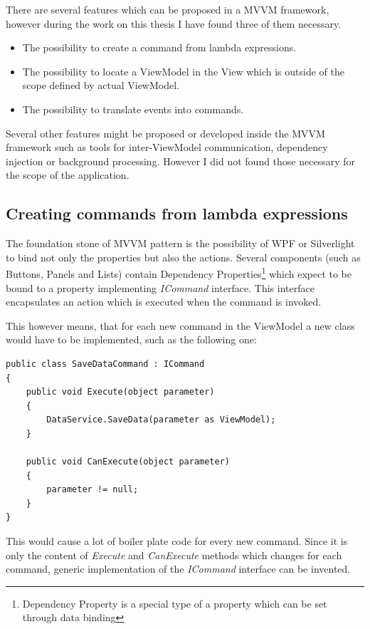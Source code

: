 There are several features which can be proposed in a MVVM framework, however during the work on this thesis I have found three of them necessary.

\begin{itemize}
	\item  The possibility to create a command from lambda expressions.
	\item  The possibility to locate a ViewModel in the View which is outside of the scope defined by actual ViewModel.
	\item  The possibility to translate events into commands.
\end{itemize}

Several other features might be proposed or developed inside the MVVM framework such as tools for inter-ViewModel communication, dependency injection or background processing. However I did not found those necessary for the scope of the application.

\subsection{Creating commands from lambda expressions}
The foundation stone of MVVM pattern is the possibility of WPF or Silverlight to bind not only the properties but also the actions. Several components (such as Buttons, Panels and Lists) contain Dependency Properties\footnote{Dependency Property is a special type of a property which can be set through data binding} which expect to be bound to a property implementing \textit{ICommand} interface. This interface encapsulates an action which is executed when the command is invoked. 

This however means, that for each new command in the ViewModel a new class would have to be implemented, such as the following one:
\begin{verbatim}
public class SaveDataCommand : ICommand
{	
    public void Execute(object parameter)
    {
        DataService.SaveData(parameter as ViewModel);
    }
    
    public void CanExecute(object parameter)
    {
        parameter != null;
    }
}
\end{verbatim}

This would cause a lot of boiler plate code for every new command. Since it is only the content of \textit{Execute} and \textit{CanExecute} methods which changes for each command, generic implementation of the \textit{ICommand} interface can be invented.

